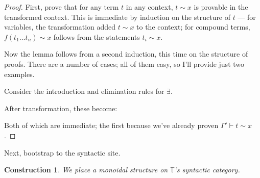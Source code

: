 \documentclass{article}
\newtheorem{construction}[theorem]{Construction}
\newcommand*{\T}{\mathbb{T}}
\begin{document}
\begin{proof}
    First, prove that for any term \(t\) in any context, \(t \sim x\) is provable in the transformed context.
    This is immediate by induction on the structure of \(t\) ---
    for variables, the transformation added \(t \sim x\) to the context;
    for compound terms, \(f(t_1 \dots t_n) \sim x\) follows from the statements \(t_i \sim x\).

    Now the lemma follows from a second induction, this time on the structure of proofs.
    There are a number of cases; all of them easy, so I'll provide just two examples.
    
    Consider the introduction and elimination rules for \(\exists\).
    After transformation, these become:
    Both of which are immediate; the first because we've already proven \(\Gamma' \vdash t \sim x\).
\end{proof}

Next, bootstrap to the syntactic site.
\begin{construction}
    We place a monoidal structure on \(\T\)'s syntactic category.
\end{construction}
\end{document}
